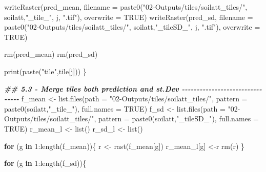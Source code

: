 \documentclass[
  10pt,
  b5paper,
  oneside]{book}
\newenvironment{Shaded}{\begin{snugshade}}{\end{snugshade}}
\newcommand{\AttributeTok}[1]{\textcolor[rgb]{0.77,0.63,0.00}{#1}}
\newcommand{\ConstantTok}[1]{\textcolor[rgb]{0.00,0.00,0.00}{#1}}
\newcommand{\ControlFlowTok}[1]{\textcolor[rgb]{0.13,0.29,0.53}{\textbf{#1}}}
\newcommand{\DecValTok}[1]{\textcolor[rgb]{0.00,0.00,0.81}{#1}}
\newcommand{\DocumentationTok}[1]{\textcolor[rgb]{0.56,0.35,0.01}{\textbf{\textit{#1}}}}
\newcommand{\FunctionTok}[1]{\textcolor[rgb]{0.00,0.00,0.00}{#1}}
\newcommand{\NormalTok}[1]{#1}
\newcommand{\OtherTok}[1]{\textcolor[rgb]{0.56,0.35,0.01}{#1}}
\newcommand{\SpecialCharTok}[1]{\textcolor[rgb]{0.00,0.00,0.00}{#1}}
\newcommand{\StringTok}[1]{\textcolor[rgb]{0.31,0.60,0.02}{#1}}
\begin{document}
\begin{Shaded}
\begin{Highlighting}[]
  \FunctionTok{writeRaster}\NormalTok{(pred\_mean, }
              \AttributeTok{filename =} \FunctionTok{paste0}\NormalTok{(}\StringTok{"02{-}Outputs/tiles/soilatt\_tiles/"}\NormalTok{,}
\NormalTok{                                soilatt,}\StringTok{"\_tile\_"}\NormalTok{, j, }\StringTok{".tif"}\NormalTok{), }
              \AttributeTok{overwrite =} \ConstantTok{TRUE}\NormalTok{)}
  \FunctionTok{writeRaster}\NormalTok{(pred\_sd, }
              \AttributeTok{filename =} \FunctionTok{paste0}\NormalTok{(}\StringTok{"02{-}Outputs/tiles/soilatt\_tiles/"}\NormalTok{,}
\NormalTok{                                soilatt,}\StringTok{"\_tileSD\_"}\NormalTok{, j, }\StringTok{".tif"}\NormalTok{), }
              \AttributeTok{overwrite =} \ConstantTok{TRUE}\NormalTok{)}
  
  \FunctionTok{rm}\NormalTok{(pred\_mean)}
  \FunctionTok{rm}\NormalTok{(pred\_sd)}
  
  
  \FunctionTok{print}\NormalTok{(}\FunctionTok{paste}\NormalTok{(}\StringTok{"tile"}\NormalTok{,tile[j]))}
\NormalTok{\}}

\DocumentationTok{\#\# 5.3 {-} Merge tiles both prediction and st.Dev {-}{-}{-}{-}{-}{-}{-}{-}{-}{-}{-}{-}{-}{-}{-}{-}{-}{-}{-}{-}{-}{-}{-}{-}{-}{-}{-}{-}{-}{-}{-}{-}}
\NormalTok{f\_mean }\OtherTok{\textless{}{-}} \FunctionTok{list.files}\NormalTok{(}\AttributeTok{path =} \StringTok{"02{-}Outputs/tiles/soilatt\_tiles/"}\NormalTok{, }
                     \AttributeTok{pattern =} \FunctionTok{paste0}\NormalTok{(soilatt,}\StringTok{"\_tile\_"}\NormalTok{), }\AttributeTok{full.names =} \ConstantTok{TRUE}\NormalTok{)}
\NormalTok{f\_sd }\OtherTok{\textless{}{-}} \FunctionTok{list.files}\NormalTok{(}\AttributeTok{path =} \StringTok{"02{-}Outputs/tiles/soilatt\_tiles/"}\NormalTok{, }
                   \AttributeTok{pattern =}  \FunctionTok{paste0}\NormalTok{(soilatt,}\StringTok{"\_tileSD\_"}\NormalTok{), }\AttributeTok{full.names =} \ConstantTok{TRUE}\NormalTok{)}
\NormalTok{r\_mean\_l }\OtherTok{\textless{}{-}} \FunctionTok{list}\NormalTok{()}
\NormalTok{r\_sd\_l }\OtherTok{\textless{}{-}} \FunctionTok{list}\NormalTok{()}

\ControlFlowTok{for}\NormalTok{ (g }\ControlFlowTok{in} \DecValTok{1}\SpecialCharTok{:}\FunctionTok{length}\NormalTok{(f\_mean))\{}
\NormalTok{  r }\OtherTok{\textless{}{-}} \FunctionTok{rast}\NormalTok{(f\_mean[g])}
\NormalTok{  r\_mean\_l[g] }\OtherTok{\textless{}{-}}\NormalTok{r}
  \FunctionTok{rm}\NormalTok{(r)}
\NormalTok{\}}

\ControlFlowTok{for}\NormalTok{ (g }\ControlFlowTok{in} \DecValTok{1}\SpecialCharTok{:}\FunctionTok{length}\NormalTok{(f\_sd))\{}
  

\end{Highlighting}
\end{Shaded}
\end{document}
